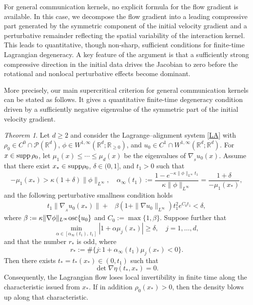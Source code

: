 \documentclass[11pt]{amsart}
\numberwithin{equation}{section}
\newtheorem{theorem}{Theorem}[section]
\theoremstyle{definition}
\theoremstyle{remark}
\numberwithin{equation}{section}
\newtheorem{theorem}{Theorem}[section]
\newcommand{\R}{\mathbb R}
\newcommand{\bq}{\begin{equation}}
\newcommand{\eq}{\end{equation}}
\newcommand{\lt}{\left}
\newcommand{\rt}{\right}
\newcommand{\calP}{\mathcal P}
\newcommand{\supp}{{\rm supp}}
\newcommand{\nabS}{\nabla_{\!\!{}_S}}
\newcommand{\nabA}{\nabla_{\!\!{}_A}}
\newcommand{\rdv}{\textnormal{osc}\{u_0\}}
\renewcommand{\ge}{\geqslant}
\renewcommand{\le}{\leqslant}
\begin{document}
 

For general communication kernels, no explicit formula for the flow gradient is available. In this case, we decompose the flow gradient into a leading compressive part generated by the symmetric component of the initial velocity gradient and a perturbative remainder reflecting the spatial variability of the interaction kernel. This leads to quantitative, though non-sharp, sufficient conditions for finite-time Lagrangian degeneracy.   A key feature of the argument is that a sufficiently strong compressive direction in the initial data drives the Jacobian to zero before the rotational and nonlocal perturbative effects become dominant. 

 

More precisely, our main supercritical criterion for general communication kernels can be stated as follows. It gives a quantitative finite-time degeneracy condition driven by a sufficiently negative eigenvalue of the symmetric part of the initial velocity gradient.


\begin{theorem}\label{thm:gen_phi_d}
Let $d\ge2$ and consider the Lagrange--alignment system \eqref{LA} with $\rho_0\in C^0\cap\calP(\R^d)$, $\phi\in W^{1,\infty}(\R^d;\R_{\ge0})$, and $u_0\in C^1\cap W^{1,\infty}(\R^d;\R^d)$. For $x\in\supp\,\rho_0$, let $\mu_1(x)\le\cdots\le\mu_d(x)$ be the eigenvalues of $\nabS u_0(x)$. Assume that there exist $x_*\in\supp\rho_0$, $\delta\in(0,1]$, and $t_1>0$ such that 
\[
-\mu_1(x_*) >\kappa(1+\delta)\|\phi\|_{L^\infty}, \quad \alpha_\infty(t_1) :=\frac{1-e^{-\kappa\|\phi\|_{L^\infty}t_1}} {\kappa\|\phi\|_{L^\infty}} =\frac{1+\delta}{-\mu_1(x_*)},
\]
and  the following perturbative smallness condition holds
\bq\label{eq:small_d_alpha}
\begin{split}
t_1\|\nabA u_0(x_*)\| +& \beta\lt(1+\|\nabla u_0\|_{L^\infty}\rt)t_1^2 e^{C_0t_1} <\delta,
 \end{split}
\eq
where $ \beta:=\kappa\|\nabla\phi\|_{L^\infty}\rdv$ and $C_0:=\max\{1,\beta\}$.\newline
Suppose further that
\bq\label{eq:sep_gen_d_alpha}
\min_{\alpha\in[\alpha_\infty(t_1),\,t_1]} |1+\alpha\mu_j(x_*)|\ge\delta, \quad j=1,\dots,d,
\eq
and that the number $r_*$ is odd, where
\[
 r_*:=\#\{j:1+\alpha_\infty(t_1)\mu_j(x_*)<0\}.
 \]
Then there exists $t_*=t_*(x_*)\in(0,t_1)$ such that
\[
\det\nabla\eta(t_*,x_*)=0.
\]
Consequently, the Lagrangian flow loses local invertibility in finite time along the characteristic issued from $x_*$. If in addition $\rho_0(x_*)>0$, then the density blows up along that characteristic.
\end{theorem}
\end{document}
